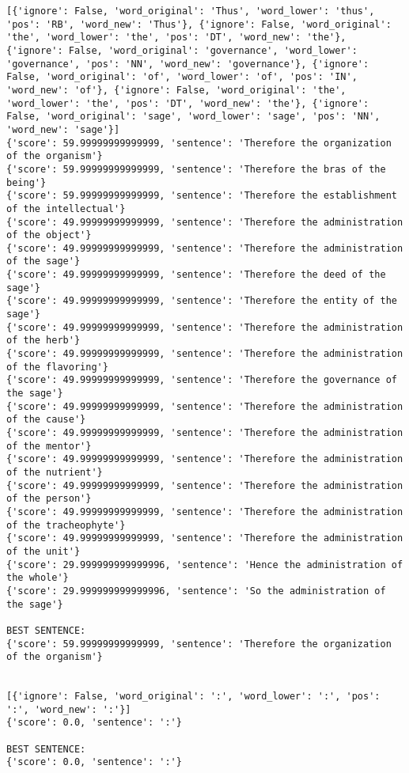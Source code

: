 \documentclass[12pt,a4paper,oneside]{book}
\begin{document}
\begin{verbatim}
[{'ignore': False, 'word_original': 'Thus', 'word_lower': 'thus', 'pos': 'RB', 'word_new': 'Thus'}, {'ignore': False, 'word_original': 'the', 'word_lower': 'the', 'pos': 'DT', 'word_new': 'the'}, {'ignore': False, 'word_original': 'governance', 'word_lower': 'governance', 'pos': 'NN', 'word_new': 'governance'}, {'ignore': False, 'word_original': 'of', 'word_lower': 'of', 'pos': 'IN', 'word_new': 'of'}, {'ignore': False, 'word_original': 'the', 'word_lower': 'the', 'pos': 'DT', 'word_new': 'the'}, {'ignore': False, 'word_original': 'sage', 'word_lower': 'sage', 'pos': 'NN', 'word_new': 'sage'}]
{'score': 59.99999999999999, 'sentence': 'Therefore the organization of the organism'}
{'score': 59.99999999999999, 'sentence': 'Therefore the bras of the being'}
{'score': 59.99999999999999, 'sentence': 'Therefore the establishment of the intellectual'}
{'score': 49.99999999999999, 'sentence': 'Therefore the administration of the object'}
{'score': 49.99999999999999, 'sentence': 'Therefore the administration of the sage'}
{'score': 49.99999999999999, 'sentence': 'Therefore the deed of the sage'}
{'score': 49.99999999999999, 'sentence': 'Therefore the entity of the sage'}
{'score': 49.99999999999999, 'sentence': 'Therefore the administration of the herb'}
{'score': 49.99999999999999, 'sentence': 'Therefore the administration of the flavoring'}
{'score': 49.99999999999999, 'sentence': 'Therefore the governance of the sage'}
{'score': 49.99999999999999, 'sentence': 'Therefore the administration of the cause'}
{'score': 49.99999999999999, 'sentence': 'Therefore the administration of the mentor'}
{'score': 49.99999999999999, 'sentence': 'Therefore the administration of the nutrient'}
{'score': 49.99999999999999, 'sentence': 'Therefore the administration of the person'}
{'score': 49.99999999999999, 'sentence': 'Therefore the administration of the tracheophyte'}
{'score': 49.99999999999999, 'sentence': 'Therefore the administration of the unit'}
{'score': 29.999999999999996, 'sentence': 'Hence the administration of the whole'}
{'score': 29.999999999999996, 'sentence': 'So the administration of the sage'}

BEST SENTENCE:
{'score': 59.99999999999999, 'sentence': 'Therefore the organization of the organism'}


[{'ignore': False, 'word_original': ':', 'word_lower': ':', 'pos': ':', 'word_new': ':'}]
{'score': 0.0, 'sentence': ':'}

BEST SENTENCE:
{'score': 0.0, 'sentence': ':'}



\end{verbatim}
\end{document}
